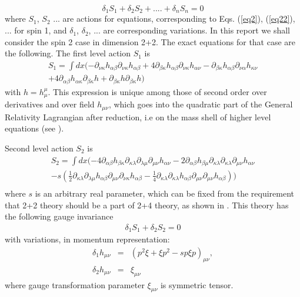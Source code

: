 \documentclass[a4paper,12pt]{article}
\begin{document}
\begin{equation}
\delta _{1}S_{1}+\delta _{2}S_{2}+....+\delta _{n}S_{n}=0
\label{eq3}
\end{equation}
where  $S_{1}$, $S_{2}$ ... are actions for equations,
corresponding to Eqs. (\ref{eq2}), (\ref{eq22}), ... for spin 1,
and  $\delta _{1}$, $\delta _{2}$, ... are corresponding
variations. In this report we shall consider the spin 2 case in
dimension 2+2. The exact equations for that case are the
following. The first level action $S_{1}$ is
\begin{equation}
\begin{array}{l}
S_1 = \int dx( - \partial _{\nu \kappa } h_{\alpha \beta }
\partial _{\nu \kappa } h_{\alpha \beta }  + 4\partial _{\beta
\kappa } h_{\alpha \beta } \partial _{\nu \kappa } h_{\alpha \nu}
- \partial _{\beta \kappa } h_{\alpha \beta } \partial _{\nu
\alpha } h_{\kappa \nu }  \\
 + 4\partial _{\alpha \beta }
h_{\alpha \kappa } \partial _{\beta \kappa } h +
\partial _{\beta \kappa } h \partial _{\beta
\kappa } h) \label{L1}
\end{array}
\end{equation}
with $h=h_{\mu}^{\mu}$.  This expression is unique among those of
second order over derivatives and over field $h_{\mu \nu }$, which
goes into the quadratic part of the General Relativity Lagrangian
after reduction, i.e on the mass shell of higher level equations
(see \cite{Man1}).

Second level action $S_{2}$ is
\begin{equation}
\begin{array}{l}
 S_2  = \int {dx( - 4\partial _{\alpha \beta } h_{\beta \kappa }\partial _{\kappa \lambda } \partial _{\lambda \mu } \partial_{\mu \nu } h_{\alpha \nu } }
 - 2\partial _{\alpha \beta } h_{\beta \mu } \partial _{\kappa \lambda } \partial _{\kappa \lambda } \partial _{\mu \nu } h_{\alpha \nu }  \label{L2} \\
- s(\frac{1}{2}\partial _{\kappa \lambda } \partial
_{\lambda\mu}h_{\alpha \beta } \partial _{\mu \nu }
\partial_{\nu\kappa } h_{\alpha \beta }  - \frac{1}{4}\partial _{\kappa \lambda } \partial _{\kappa \lambda } h_{\alpha \beta } \partial _{\mu \nu } \partial _{\mu \nu } h_{\alpha \beta } )) \\
 \end{array}
\end{equation}
where $s$ is an arbitrary real parameter, which can be fixed from
the requirement that 2+2 theory should be a part of 2+4 theory, as
shown in \cite{Man2}. This theory has the following gauge
invariance
\begin{eqnarray}
\delta _1 S_1  + \delta _2 S_2  = 0 \label{22}
\end{eqnarray}
with  variations, in momentum representation:
\begin{eqnarray}
\delta _{1}h_{\mu \nu } &=&(p^{2}\xi +\xi p^{2}-s p \xi p)_{\mu \nu } ,\label{d1}\\
\delta _{2}h_{\mu \nu } &=&\xi_{\mu \nu } \label{d2}
\end{eqnarray}
where gauge transformation parameter $\xi_{\mu \nu }$ is symmetric
tensor.
\end{document}
